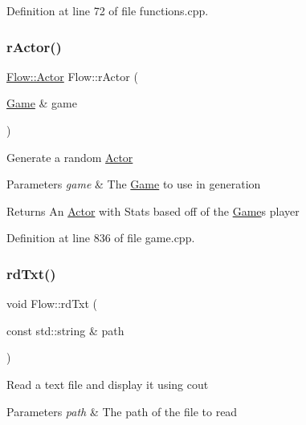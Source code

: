 Definition at line 72 of file functions.\+cpp.

\hypertarget{namespace_flow_ad2921d35a512b47f3d231ae37f730e61}{}\label{namespace_flow_ad2921d35a512b47f3d231ae37f730e61} 
\subsubsection{\texorpdfstring{r\+Actor()}{rActor()}}
{\footnotesize\ttfamily \hyperlink{class_flow_1_1_actor}{Flow\+::\+Actor} Flow\+::r\+Actor (\begin{DoxyParamCaption}\item[{\hyperlink{class_flow_1_1_game}{Game} \&}]{game }\end{DoxyParamCaption})}

Generate a random \hyperlink{class_flow_1_1_actor}{Actor} 
\begin{DoxyParams}{Parameters}
{\em game} & The \hyperlink{class_flow_1_1_game}{Game} to use in generation \\
\hline
\end{DoxyParams}
\begin{DoxyReturn}{Returns}
An \hyperlink{class_flow_1_1_actor}{Actor} with Stats based off of the \hyperlink{class_flow_1_1_game}{Game}\textquotesingle{}s player 
\end{DoxyReturn}


Definition at line 836 of file game.\+cpp.

\hypertarget{namespace_flow_a652e3e72e118566969bd80c132bd4964}{}\label{namespace_flow_a652e3e72e118566969bd80c132bd4964} 
\subsubsection{\texorpdfstring{rd\+Txt()}{rdTxt()}\hspace{0.1cm}{\footnotesize\ttfamily [1/2]}}
{\footnotesize\ttfamily void Flow\+::rd\+Txt (\begin{DoxyParamCaption}\item[{const std\+::string \&}]{path }\end{DoxyParamCaption})}

Read a text file and display it using cout 
\begin{DoxyParams}{Parameters}
{\em path} & The path of the file to read \\
\hline
\end{DoxyParams}


